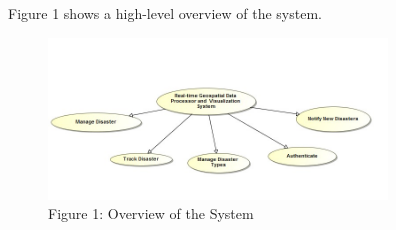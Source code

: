 Figure 1 shows a high-level overview of the system.
\begin{figure}[ht!]
\centering
\includegraphics[width=90mm]{../images/system_overview.jpg}
\caption{Figure 1: Overview of the System \label{overflow}}
\end{figure}